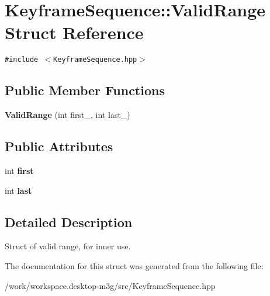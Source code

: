 \hypertarget{structm3g_1_1KeyframeSequence_1_1ValidRange}{
\section{KeyframeSequence::ValidRange Struct Reference}
\label{structm3g_1_1KeyframeSequence_1_1ValidRange}
}
{\tt \#include $<$KeyframeSequence.hpp$>$}

\subsection*{Public Member Functions}
\begin{CompactItemize}
\item 
\hypertarget{structm3g_1_1KeyframeSequence_1_1ValidRange_d9ada86c9bba00101977e5f3f456b9ce}{
\textbf{ValidRange} (int first\_\-, int last\_\-)}
\label{structm3g_1_1KeyframeSequence_1_1ValidRange_d9ada86c9bba00101977e5f3f456b9ce}

\end{CompactItemize}
\subsection*{Public Attributes}
\begin{CompactItemize}
\item 
\hypertarget{structm3g_1_1KeyframeSequence_1_1ValidRange_6c8ec3c3e77241328358d43697f6f840}{
int \textbf{first}}
\label{structm3g_1_1KeyframeSequence_1_1ValidRange_6c8ec3c3e77241328358d43697f6f840}

\item 
\hypertarget{structm3g_1_1KeyframeSequence_1_1ValidRange_72e27dee31b1c4c6a504fbed29542d97}{
int \textbf{last}}
\label{structm3g_1_1KeyframeSequence_1_1ValidRange_72e27dee31b1c4c6a504fbed29542d97}

\end{CompactItemize}


\subsection{Detailed Description}
Struct of valid range, for inner use. 

The documentation for this struct was generated from the following file:\begin{CompactItemize}
\item 
/work/workspace.desktop-m3g/src/KeyframeSequence.hpp\end{CompactItemize}

